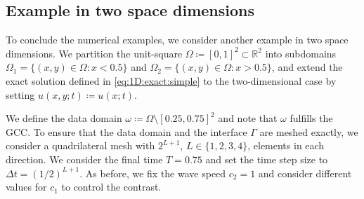 \documentclass[sn-mathphys-num]{sn-jnl}
\numberwithin{equation}{section}
\begin{document}
\begin{comment}
                \addplot+[discard if not={L}{3},line width=1.1pt,mark=none] table [x=x, y=y_dt, col sep=comma] {../data/plots/weakDisc_evenhigherDt_noRestrict_approx_plot_data_WPFalse_contrast2.0_k3.csv};

                \addplot+[discard if not={L}{4},line width=1.1pt,mark=none] table [x=x, y=y_dt, col sep=comma] {../data/plots/weakDisc_evenhigherDt_noRestrict_approx_plot_data_WPFalse_contrast2.0_k3.csv};
                
                \draw[dashed,gray,very thick] (0.5,-2) -- (0.5,2);
                \node [draw=none] at (axis description cs:0.53,0.125) {\color{gray} $\Gamma$};
                \node [draw=none] at (axis description cs:0.175,0.125) {\color{gray} $\omega$};
                \node [draw=none] at (axis description cs:0.83,0.125) {\color{gray} $\omega$};
          
                \legend{exact,$L=3$, $L=4$}
            \end{groupplot}
        \end{tikzpicture}
        \caption{The $L^2$-bestapproximation error of \eqref{eq:1D:complicatedSol} with $k = 2$ for $c_2 = 1$ and $c_1 \in \{1.0,1.5,2.0\}$ (left) and the approximation of the time derivative of \eqref{eq:1D:complicatedSol} with $k = 3$ for $c_1 = 2.5$ for $L = 4,5$, $h = 1/2^{L+1} = \Delta t$ (right). \textbf{what is happening here now? before it was $\mathcal{O}(h^2)$ and $\mathcal{O}(h^{3/2})$..., right plot looks fine, also $c_1 = 2.0$ for the right plot...}}
        \label{fig:1D:complicatedSol}
    \end{center}
  \end{figure}

\end{comment}

\subsection{Example in two space dimensions}
To conclude the numerical examples, we consider another example in two space dimensions. We partition the unit-square $\Omega \coloneqq [0,1]^2 \subset \mathbb{R}^2$ into subdomains $\Omega_1 = \{ (x,y) \in \Omega: x < 0.5 \}$ and $\Omega_2 = \{ (x,y) \in \Omega: x > 0.5 \}$, and 
extend the exact solution defined in \eqref{eq:1D:exact:simple} to the two-dimensional case by setting $u(x,y;t) \coloneqq u(x;t)$. 

We define the data domain $\omega \coloneqq \Omega \setminus [0.25,0.75]^2$ and note that $\omega$ fulfills the GCC. To ensure that the data domain and the interface $\Gamma$ are meshed exactly, we consider a quadrilateral mesh with $2^{L+1}$, $L \in \{1,2,3,4\}$, elements in each direction. We consider the final time $T = 0.75$  and set the time step size to $\Delta t = (1/2)^{L+1}$. As before, we fix the wave speed $c_2 = 1$ and consider different values for $c_1$ to control the contrast. 
\end{document}
